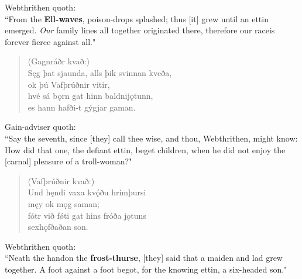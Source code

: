 \bvb Webthrithen quoth: \\ “From the \textbf{Ell-waves}, poison-drops splashed; thus [it] grew until an ettin emerged. \emph{Our} family lines all together originated there, therefore our race\footnotemark[45] is forever fierce against all.\footnotemark[46]" \\

\begin{verse}
(Gagnráðr kvað:) \\%
\bva Sęg þat sjaunda, \hld alls þik svinnan kveða, \\%
\ind ok þú Vafþrúðnir vitir, \\%
hvé sá bǫrn gat \hld hinn baldni\footnotemark[25] jǫtunn, \\%
\ind es hann hafði-t gýgjar gaman.\\%
\end{verse}

\bvb Gain-adviser quoth: \\ “Say the seventh, since [they] call thee wise, and thou, Webthrithen, might know: How did that one, the defiant ettin, beget children, when he did not enjoy the [carnal] pleasure of a troll-woman?" \\

\begin{verse}
(Vafþrúðnir kvað:) \\%
\bva Und hęndi vaxa \hld kvǫ́ðu hrímþursi \\%
\ind męy ok mǫg saman; \\%
fótr við fǿti \hld gat hins fróða jǫtuns \\%
\ind sexhǫfðaðan son.\\%
\end{verse}

\bvb Webthrithen quoth: \\ “Neath the hand\footnotemark[50] on the \textbf{frost-thurse}, [they] said that a maiden and lad grew together. A foot against a foot begot, for the knowing ettin, a six-headed son." \\

